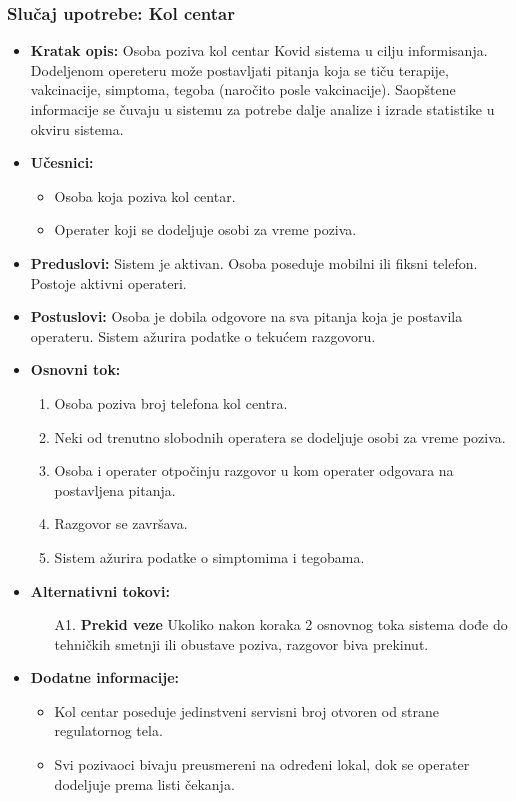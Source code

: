 \documentclass[titlepage]{article}
\begin{document}
\subsubsection{Slučaj upotrebe: Kol centar}
\begin{itemize}
\item \textbf{Kratak opis:} Osoba poziva kol centar Kovid sistema u cilju informisanja. Dodeljenom opereteru može postavljati pitanja koja se tiču terapije, vakcinacije, simptoma, tegoba (naročito posle vakcinacije). Saopštene informacije se čuvaju u sistemu za potrebe dalje analize i izrade statistike u okviru sistema.
\item \textbf{Učesnici:}
\begin{itemize}
    \item Osoba koja poziva kol centar.
    \item Operater koji se dodeljuje osobi za vreme poziva.
\end{itemize}
 \item \textbf{Preduslovi:} Sistem je aktivan. Osoba poseduje mobilni ili fiksni telefon. Postoje aktivni operateri.
 \item \textbf{Postuslovi:} Osoba je dobila odgovore na sva pitanja koja je postavila operateru. Sistem ažurira podatke o tekućem razgovoru.
 \item \textbf{Osnovni tok:}
 \begin{enumerate}
    \item Osoba poziva broj telefona kol centra.
    \item Neki od trenutno slobodnih operatera se dodeljuje osobi za vreme poziva.
    \item Osoba i operater otpočinju razgovor u kom operater odgovara na postavljena pitanja.
    \item Razgovor se završava.
    \item Sistem ažurira podatke o simptomima i tegobama.
 \end{enumerate}
 \item \textbf{Alternativni tokovi:}
 \begin{itemize}
            \item[A1.] \textbf{Prekid veze} Ukoliko nakon koraka 2 osnovnog toka sistema dođe do tehničkih smetnji ili obustave poziva, razgovor biva prekinut.
        \end{itemize}
 \item \textbf{Dodatne informacije:}
            \begin{itemize}
                \item Kol centar poseduje jedinstveni servisni broj otvoren od strane regulatornog tela.
                \item Svi pozivaoci bivaju preusmereni na određeni lokal, dok se operater dodeljuje prema listi čekanja.
            \end{itemize}

\end{itemize}
\end{document}
